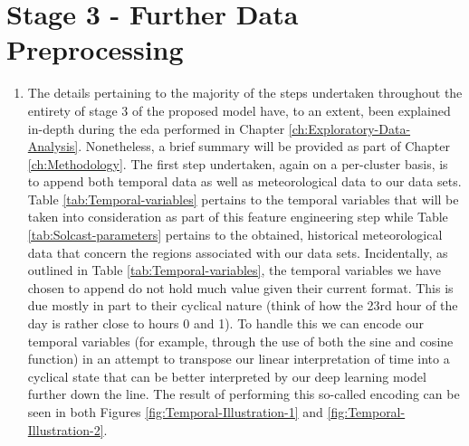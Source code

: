 \section{Stage 3 - Further Data Preprocessing}
\label{sec:Methodology:Stage-3}
\begin{adjustwidth}{-1.65cm}{-0.0cm}%
    \begin{enumerate}[label=Step 3.\arabic*:, leftmargin=*]
    \item The details pertaining to the majority of the steps undertaken throughout the entirety of stage 3 of the proposed model have, to an extent, been explained in-depth during the \gls{eda} performed in Chapter \ref{ch:Exploratory-Data-Analysis}. Nonetheless, a brief summary will be provided as part of Chapter \ref{ch:Methodology}. The first step undertaken, again on a per-cluster basis, is to append both temporal data as well as meteorological data to our data sets. Table \ref{tab:Temporal-variables} pertains to the temporal variables that will be taken into consideration as part of this feature engineering step while Table \ref{tab:Solcast-parameters} pertains to the obtained, historical meteorological data that concern the regions associated with our data sets. Incidentally, as outlined in Table \ref{tab:Temporal-variables}, the temporal variables we have chosen to append do not hold much value given their current format. This is due mostly in part to their cyclical nature (think of how the 23rd hour of the day is rather close to hours 0 and 1). To handle this we can encode our temporal variables (for example, through the use of both the sine and cosine function) in an attempt to transpose our linear interpretation of time into a cyclical state that can be better interpreted by our deep learning model further down the line. The result of performing this so-called encoding can be seen in both Figures \ref{fig:Temporal-Illustration-1} and \ref{fig:Temporal-Illustration-2}.
    

\end{enumerate}
\end{adjustwidth}
